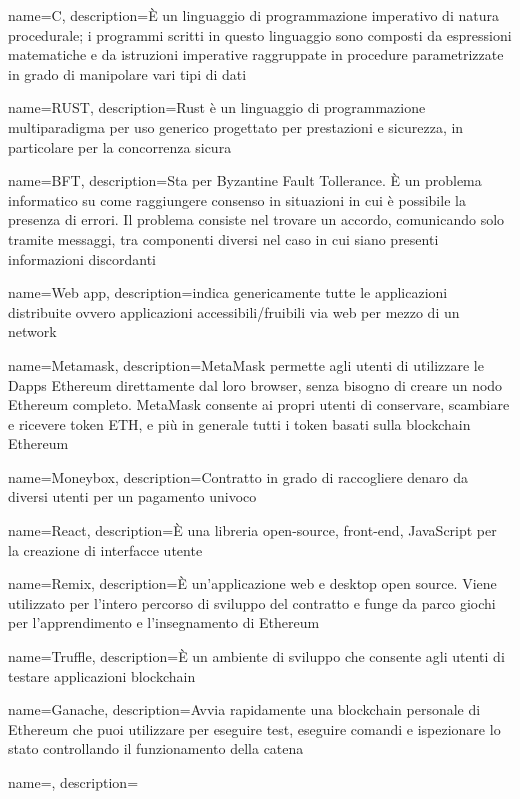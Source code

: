 {
	name={C},
	description={È un linguaggio di programmazione imperativo di natura procedurale; i programmi scritti in questo linguaggio sono composti da espressioni matematiche e da istruzioni imperative raggruppate in procedure parametrizzate in grado di manipolare vari tipi di dati}
}

{
	name={RUST},
	description={Rust è un linguaggio di programmazione multiparadigma per uso generico progettato per prestazioni e sicurezza, in particolare per la concorrenza sicura}
}

{
	name={BFT},
	description={Sta per Byzantine Fault Tollerance. È un problema informatico su come raggiungere consenso in situazioni in cui è possibile la presenza di errori. Il problema consiste nel trovare un accordo, comunicando solo tramite messaggi, tra componenti diversi nel caso in cui siano presenti informazioni discordanti}
}

{
	name={Web app},
	description={indica genericamente tutte le applicazioni distribuite ovvero applicazioni accessibili/fruibili via web per mezzo di un network}
}

{
	name={Metamask},
	description={MetaMask permette agli utenti di utilizzare le Dapps Ethereum direttamente dal loro browser, senza bisogno di creare un nodo Ethereum completo. MetaMask consente ai propri utenti di conservare, scambiare e ricevere token ETH, e più in generale tutti i token basati sulla blockchain Ethereum}
}

{
	name={Moneybox},
	description={Contratto in grado di raccogliere denaro da diversi utenti per un pagamento univoco}
}

{
	name={React},
	description={È una libreria open-source, front-end, JavaScript per la creazione di interfacce utente}
}

{
	name={Remix},
	description={È un'applicazione web e desktop open source. Viene utilizzato per l'intero percorso di sviluppo del contratto e funge da parco giochi per l'apprendimento e l'insegnamento di Ethereum}
}

{
	name={Truffle},
	description={È un ambiente di sviluppo che consente agli utenti di testare applicazioni blockchain\glo{}}
}

{
	name={Ganache},
	description={Avvia rapidamente una blockchain personale di Ethereum che puoi utilizzare per eseguire test, eseguire comandi e ispezionare lo stato controllando il funzionamento della catena}
}

\newglossaryentry{}
{
	name={},
	description={}
}